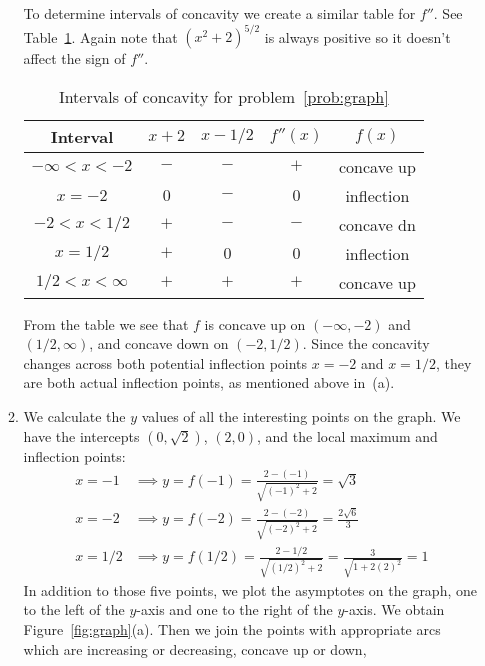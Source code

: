 \documentclass{article}
\begin{document}
\begin{enumerate}
\begin{enumerate}
    To determine intervals of concavity we create a similar table for $f''$.
    See Table~\ref{tab:conc}.
    Again note that $(x^2+2)^{5/2}$ is always positive so it doesn't
    affect the sign of $f''$.
    \begin{table}[htbp]
      \centering
      \begin{tabular}{|c|c|c|c|c|}
        \hline
        Interval       & $x+2$ & $x-1/2$ & $f''(x)$ & $f(x)$ 
        \\ \hline
        $-\infty<x<-2$ & $-$   & $-$     & $+$      & concave up 
        \\ \hline
        $x=-2$         & $0$   & $-$     & $0$      & inflection
        \\ \hline
        $-2<x<1/2$     & $+$   & $-$     & $-$      & concave dn 
        \\ \hline
        $x=1/2$        & $+$   & $0$     & $0$      & inflection
        \\ \hline
        $1/2<x<\infty$ & $+$   & $+$     & $+$      & concave up
        \\ \hline
      \end{tabular}
      \caption{Intervals of concavity for problem~\ref{prob:graph}}
      \label{tab:conc}
    \end{table}
    From the table we see that $f$ is concave up on $(-\infty,-2)$ and
    $(1/2,\infty)$, and concave down on $(-2,1/2)$.  Since the concavity
    changes across both potential inflection points $x=-2$ and $x=1/2$,
    they are both actual inflection points, as mentioned above in~(a).
  \item %
    We calculate the $y$ values of all the interesting points on the graph.
    We have the intercepts $(0,\sqrt{2})$, $(2,0)$, and the local maximum
    and inflection points:
    \begin{align*}
      x=-1 &\implies y=f(-1)=\frac{2-(-1)}{\sqrt{(-1)^2+2}} = \sqrt{3}
      \\
      x=-2 &\implies y=f(-2)= \frac{2-(-2)}{\sqrt{(-2)^2+2}} 
      = \frac{2\sqrt{6}}{3}
      \\
      x=1/2 &\implies y=f(1/2) = \frac{2-1/2}{\sqrt{(1/2)^2+2}}
      = \frac{3}{\sqrt{1+2(2)^2}} = 1
    \end{align*}
    In addition to those five points, we plot the asymptotes on the graph,
    one to the left of the $y$-axis and one to the right of the $y$-axis.
    We obtain Figure~\ref{fig:graph}(a).  Then we join the points with 
    appropriate arcs which are increasing or decreasing, concave up or down,

\end{enumerate}
\end{enumerate}
\end{document}
